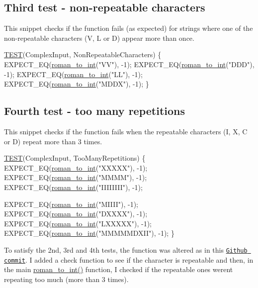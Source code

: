  \subsection*{Third test -\/ non-\/repeatable characters }

This snippet checks if the function fails (as expected) for strings where one of the non-\/repeatable characters (V, L or D) appear more than once.


\begin{DoxyCodeInclude}
\hyperlink{test_simple_8c_aff9fa977573ddab7597e233f1775d7c5}{TEST}(ComplexInput, NonRepeatableCharacters) \{
    EXPECT\_EQ(\hyperlink{roman_8c_a5d15ad3ed29e4dc0fed9b718523c48c8}{roman\_to\_int}(\textcolor{stringliteral}{"VV"}), -1);
    EXPECT\_EQ(\hyperlink{roman_8c_a5d15ad3ed29e4dc0fed9b718523c48c8}{roman\_to\_int}(\textcolor{stringliteral}{"DDD"}), -1);
    EXPECT\_EQ(\hyperlink{roman_8c_a5d15ad3ed29e4dc0fed9b718523c48c8}{roman\_to\_int}(\textcolor{stringliteral}{"LL"}), -1);
    EXPECT\_EQ(\hyperlink{roman_8c_a5d15ad3ed29e4dc0fed9b718523c48c8}{roman\_to\_int}(\textcolor{stringliteral}{"MDDX"}), -1);
\}
\end{DoxyCodeInclude}
 \subsection*{Fourth test -\/ too many repetitions }

This snippet checks if the function fails when the repeatable characters (I, X, C or D) repeat more than 3 times.


\begin{DoxyCodeInclude}
\hyperlink{test_simple_8c_aff9fa977573ddab7597e233f1775d7c5}{TEST}(ComplexInput, TooManyRepetitions) \{
    EXPECT\_EQ(\hyperlink{roman_8c_a5d15ad3ed29e4dc0fed9b718523c48c8}{roman\_to\_int}(\textcolor{stringliteral}{"XXXXX"}), -1);
    EXPECT\_EQ(\hyperlink{roman_8c_a5d15ad3ed29e4dc0fed9b718523c48c8}{roman\_to\_int}(\textcolor{stringliteral}{"MMMM"}), -1);
    EXPECT\_EQ(\hyperlink{roman_8c_a5d15ad3ed29e4dc0fed9b718523c48c8}{roman\_to\_int}(\textcolor{stringliteral}{"IIIIIIII"}), -1);
    
    EXPECT\_EQ(\hyperlink{roman_8c_a5d15ad3ed29e4dc0fed9b718523c48c8}{roman\_to\_int}(\textcolor{stringliteral}{"MIIII"}), -1);
    EXPECT\_EQ(\hyperlink{roman_8c_a5d15ad3ed29e4dc0fed9b718523c48c8}{roman\_to\_int}(\textcolor{stringliteral}{"DXXXX"}), -1);
    EXPECT\_EQ(\hyperlink{roman_8c_a5d15ad3ed29e4dc0fed9b718523c48c8}{roman\_to\_int}(\textcolor{stringliteral}{"LXXXXX"}), -1);
    EXPECT\_EQ(\hyperlink{roman_8c_a5d15ad3ed29e4dc0fed9b718523c48c8}{roman\_to\_int}(\textcolor{stringliteral}{"MMMMMDXII"}), -1);
\}
\end{DoxyCodeInclude}
 To satisfy the 2nd, 3rd and 4th tests, the function was altered as in this \href{https://github.com/diogenes1oliveira/libroman/commit/2da558c048fbe2a989ed9bceddb52fc4b1b615b7#diff-3d6fc1bf772186c45fcd2c22d7ecd7b4}{\tt Github commit}. I added a check function to see if the character is repeatable and then, in the main {\ttfamily \hyperlink{roman_8c_a5d15ad3ed29e4dc0fed9b718523c48c8}{roman\+\_\+to\+\_\+int()}} function, I checked if the repeatable ones weren\textquotesingle{}t repeating too much (more than 3 times).

